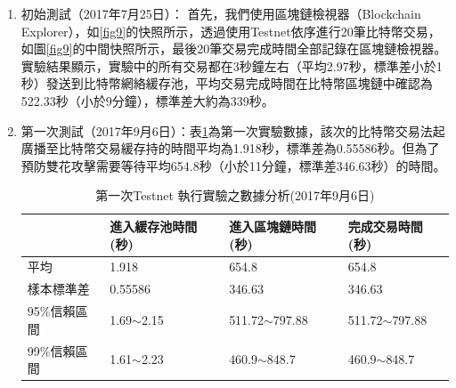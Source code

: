 		\begin{enumerate}
			\item 初始測試（2017年7月25日）：
			首先，我們使用區塊鏈檢視器（Blockchain Explorer）\supercite{Blockchainexplorer:Ananalyticalprocessandinvestigationenvironmentforbitcoin}，如\ref{fig9}的快照所示，透過使用Testnet依序進行20筆比特幣交易，如圖\ref{fig9}的中間快照所示，最後20筆交易完成時間全部記錄在區塊鏈檢視器。實驗結果顯示，實驗中的所有交易都在3秒鐘左右（平均2.97秒，標準差小於1秒）發送到比特幣網絡緩存池，平均交易完成時間在比特幣區塊鏈中確認為522.33秒（小於9分鐘），標準差大約為339秒。

			\item 第一次測試（2017年9月6日）：表\ref{1general}為第一次實驗數據，該次的比特幣交易法起廣播至比特幣交易緩存持的時間平均為1.918秒，標準差為0.55586秒。但為了預防雙花攻擊需要等待平均654.8秒（小於11分鐘，標準差346.63秒）的時間。

				\begin{table}[htbp]
				\centering
				\caption{第一次Testnet 執行實驗之數據分析(2017年9月6日)}
				\label{1general}
				\begin{tabular}{|l|l|l|l|}
				\hline
				 & 進入緩存池時間(秒) & 進入區塊鏈時間(秒) & 完成交易時間(秒) \\ \hline
				平均 & 1.918 & 654.8 & 654.8 \\ \hline
				樣本標準差 & 0.55586 & 346.63 & 346.63 \\ \hline
				95\%信賴區間 & 1.69$\sim$2.15 & 511.72$\sim$797.88 & 511.72$\sim$797.88 \\ \hline
				99\%信賴區間 & 1.61$\sim$2.23 & 460.9$\sim$848.7 & 460.9$\sim$848.7 \\ \hline
				\end{tabular}
				\end{table}


\end{enumerate}
